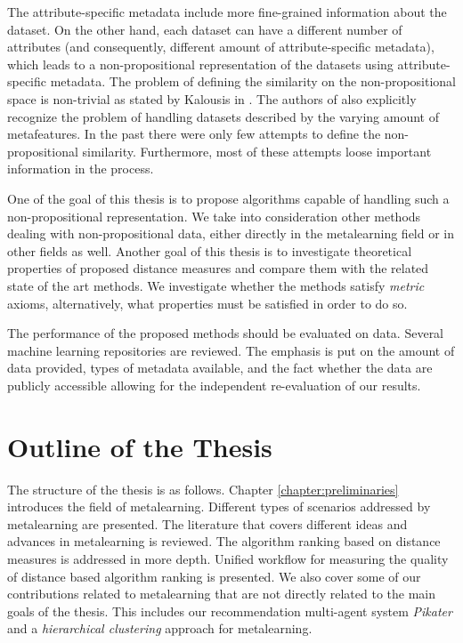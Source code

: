 The attribute-specific metadata include more fine-grained information about the dataset. On the other hand, each dataset can have a different number of attributes (and consequently, different amount of attribute-specific metadata), which leads to a non-propositional representation of the datasets using attribute-specific metadata. The problem of defining the similarity on the non-propositional space is non-trivial as stated by Kalousis in \cite{RepresentationalIssuesInMetalearning}. The authors of \cite{BrazdilMetalearning-2009} also explicitly recognize the problem of handling datasets described by the varying amount of metafeatures.
In the past there were only few attempts to define the non-propositional similarity. Furthermore, most of these attempts loose important information in the process.

One of the goal of this thesis is to propose algorithms capable of handling such a non-propositional representation. We take into consideration other methods dealing with non-propositional data, either directly in the metalearning field or in other fields as well.
Another goal of this thesis is to investigate theoretical properties of proposed distance measures and compare them with the related state of the art methods. We investigate whether the methods satisfy \emph{metric} axioms, alternatively, what properties must be satisfied in order to do so.

The performance of the proposed methods should be evaluated on data. Several machine learning repositories are reviewed. The emphasis is put on the amount of data provided, types of metadata available, and the fact whether the data are publicly accessible allowing for the independent re-evaluation of our results.


\section{Outline of the Thesis}
The structure of the thesis is as follows. Chapter \ref{chapter:preliminaries} introduces the field of metalearning. Different types of scenarios addressed by metalearning are presented. The literature that covers different ideas and advances in metalearning is reviewed. The algorithm ranking based on distance measures is addressed in more depth. Unified workflow for measuring the quality of distance based algorithm ranking is presented. We also cover some of our contributions related to metalearning that are not directly related to the main goals of the thesis. This includes our recommendation multi-agent system \emph{Pikater} and a \emph{hierarchical clustering} approach for metalearning.  

